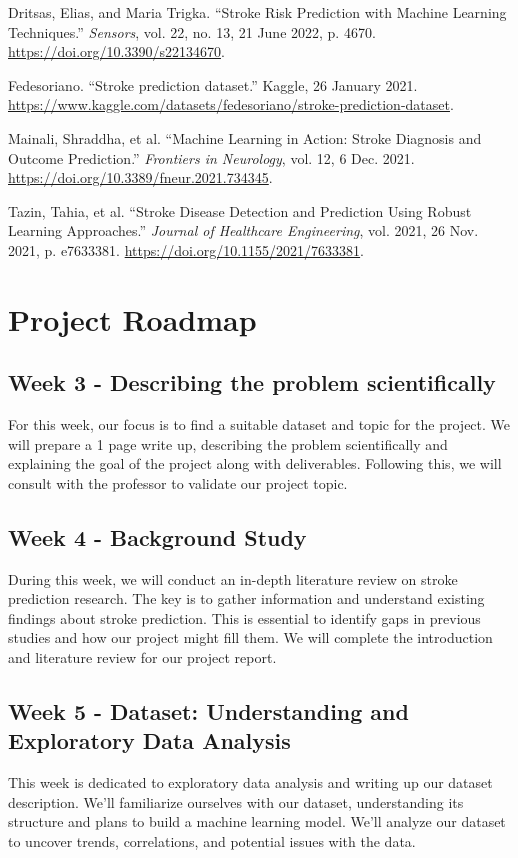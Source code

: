 \documentclass[11pt]{article}
\begin{document}
\newpage
\begin{thebibliography}{99}
Dritsas, Elias, and Maria Trigka. ``Stroke Risk Prediction with Machine Learning Techniques.'' \emph{Sensors}, vol. 22, no. 13, 21 June 2022, p. 4670. \url{https://doi.org/10.3390/s22134670}.

Fedesoriano. ``Stroke prediction dataset.'' Kaggle, 26 January 2021. \url{https://www.kaggle.com/datasets/fedesoriano/stroke-prediction-dataset}.

Mainali, Shraddha, et al. ``Machine Learning in Action: Stroke Diagnosis and Outcome Prediction.'' \emph{Frontiers in Neurology}, vol. 12, 6 Dec. 2021. \url{https://doi.org/10.3389/fneur.2021.734345}.

Tazin, Tahia, et al. ``Stroke Disease Detection and Prediction Using Robust Learning Approaches.'' \emph{Journal of Healthcare Engineering}, vol. 2021, 26 Nov. 2021, p. e7633381. \url{https://doi.org/10.1155/2021/7633381}.
\end{thebibliography}

\newpage
\section*{Project Roadmap}

\subsection*{Week 3 - Describing the problem scientifically}
For this week, our focus is to find a suitable dataset and topic for the project. We will prepare a 1 page write up, describing the problem scientifically and explaining the goal of the project along with deliverables. Following this, we will consult with the professor to validate our project topic.

\subsection*{Week 4 - Background Study}
During this week, we will conduct an in-depth literature review on stroke prediction research. The key is to gather information and understand existing findings about stroke prediction. This is essential to identify gaps in previous studies and how our project might fill them. We will complete the introduction and literature review for our project report.  

\subsection*{Week 5 - Dataset: Understanding and Exploratory Data Analysis}
This week is dedicated to exploratory data analysis and writing up our dataset description. We’ll familiarize ourselves with our dataset, understanding its structure and plans to build a machine learning model. We’ll analyze our dataset to uncover trends, correlations, and potential issues with the data.
\end{document}
